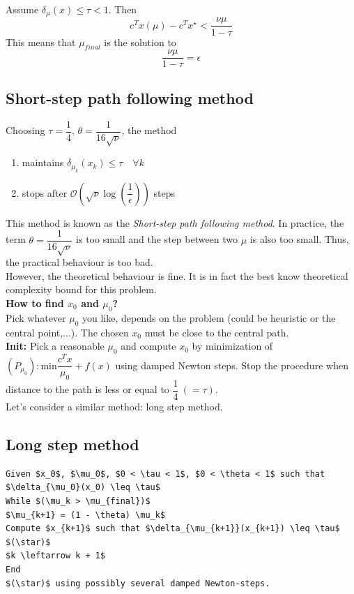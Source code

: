 \begin{theorem}
Assume $\delta_{\mu}(x) \leq \tau < 1$. Then
$$c^T x(\mu) - c^T x^{\star} < \frac{\nu\mu}{1 - \tau}$$
This means that $\mu_{final}$ is the solution to
$$\frac{\nu\mu}{1 - \tau} = \epsilon$$
\end{theorem}

\subsection{Short-step path following method}

\begin{theorem}
Choosing $\tau = \dfrac{1}{4}$, $\theta = \dfrac{1}{16 \sqrt{\nu}}$, the method 
\begin{enumerate}
\item maintains $\delta_{\mu_k}(x_k) \leq \tau \quad \forall k$ 
\item stops after $\mathcal{O}(\sqrt{\nu} \log(\dfrac{1}{\epsilon}))$ steps
\end{enumerate}
\end{theorem}

This method is known as the \textit{Short-step path following method}. In practice, the term $\theta = \dfrac{1}{16 \sqrt{\nu}}$ is too small and the step between two $\mu$ is also too small. Thus, the practical behaviour is too bad.\\
However, the theoretical behaviour is fine. It is in fact the best know theoretical complexity bound for this problem.\\

\textbf{How to find $x_0$ and $\mu_0$?}\\
Pick whatever $\mu_0$ you like, depends on the problem (could be heuristic or the central point,...). The chosen $x_0$ must be close to the central path.\\
\textbf{Init:} Pick a reasonable $\mu_0$ and compute $x_0$ by minimization of $(P_{\mu_0}):  \text{min} \dfrac{c^T x}{\mu_0} + f(x)$ using damped Newton steps. Stop the procedure when distance to the path is less or equal to $\dfrac{1}{4}\ (=\tau)$.\\
Let's consider a similar method: long step method.

\subsection{Long step method}

\begin{lstlisting}[mathescape,caption=Long step method]
Given $x_0$, $\mu_0$, $0 < \tau < 1$, $0 < \theta < 1$ such that $\delta_{\mu_0}(x_0) \leq \tau$
While $(\mu_k > \mu_{final})$
$\mu_{k+1} = (1 - \theta) \mu_k$ 
Compute $x_{k+1}$ such that $\delta_{\mu_{k+1}}(x_{k+1}) \leq \tau$ $(\star)$
$k \leftarrow k + 1$
End
$(\star)$ using possibly several damped Newton-steps. 
\end{lstlisting}

